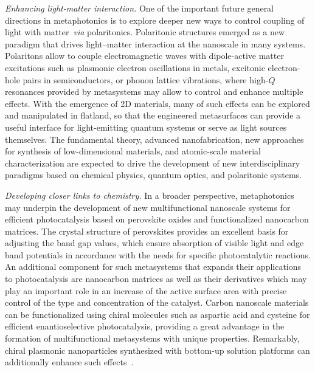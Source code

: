 \documentclass[journal=chreay,manuscript=review]{achemso}
\begin{document}
{\it Enhancing light-matter interaction.} One of the important future general directions in metaphotonics is to explore deeper new ways to control coupling of light with matter~\textit{via} polaritonics. Polaritonic structures emerged as a new paradigm that drives light–matter interaction at the nanoscale in many systems. Polaritons allow to couple electromagnetic waves with dipole-active matter excitations such as plasmonic electron oscillations in metals, excitonic electron-hole pairs in semiconductors, or phonon lattice vibrations, where high-$Q$ resonances provided by metasystems may allow to control and enhance multiple effects. With the emergence of 2D materials, many of such effects can be explored and manipulated in flatland, so that the engineered metasurfaces can provide a useful interface for light-emitting quantum systems or serve as light sources themselves. The fundamental theory, advanced nanofabrication, new approaches for synthesis of low-dimensional materials, and atomic-scale material characterization are expected to drive the development of new interdisciplinary paradigms based on chemical physics, quantum optics,  and polaritonic systems. 

{\it Developing closer links to chemistry.} In a broader perspective, metaphotonics may underpin the development of new multifunctional nanoscale systems for efficient photocatalysis based on perovskite oxides and functionalized nanocarbon matrices. The crystal structure of perovskites provides an excellent basis for adjusting the band gap values, which ensure absorption of visible light and edge band potentials in accordance with the needs for specific photocatalytic reactions. An additional component for such metasystems that expands their applications to photocatalysis are nanocarbon matrices as well as their derivatives which may play an important role in an increase of the active surface area with precise control of the type and concentration of the catalyst. Carbon nanoscale materials can be functionalized using chiral molecules such as aspartic acid and cysteine for efficient enantioselective photocatalysis, providing a great advantage in the formation of multifunctional metasystems with unique properties. Remarkably, chiral plasmonic nanoparticles synthesized with bottom-up solution platforms can additionally enhance such effects~\cite{lee2018amino}.
\end{document}

